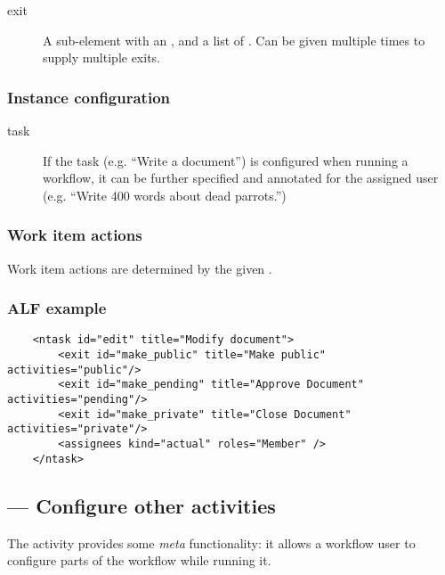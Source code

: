     \begin{description}
        \item[exit] A sub-element with an ,  and a list of . Can be given multiple times
            to supply multiple exits.
    \end{description}

  \subsubsection{Instance configuration}

    \begin{description}
        \item[task] If the task (e.g. ``Write a document'') is configured when
            running a workflow, it can be further specified and annotated for
            the assigned user (e.g. ``Write 400 words about dead parrots.'') 

    \end{description}

  \subsubsection{Work item actions} %

    Work item actions are determined by the given .
    
  \subsubsection{ALF example}

\begin{verbatim}
    <ntask id="edit" title="Modify document">
        <exit id="make_public" title="Make public" activities="public"/>
        <exit id="make_pending" title="Approve Document" activities="pending"/>
        <exit id="make_private" title="Close Document" activities="private"/>
        <assignees kind="actual" roles="Member" />
    </ntask>
\end{verbatim}

 \subsection{ --- Configure other activities}

 
  The  activity provides some \emph{meta} functionality:
  it allows a workflow user to configure parts of the workflow while running
  it.

